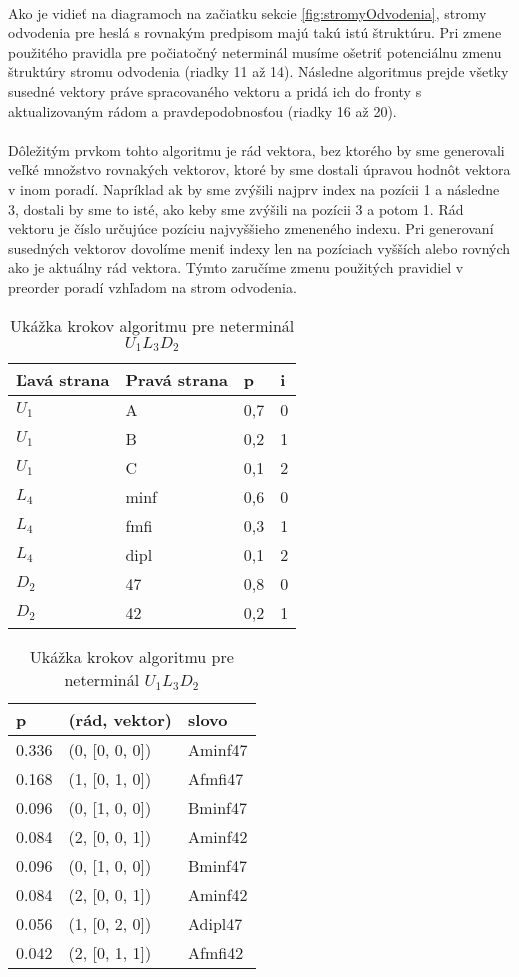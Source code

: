 \paragraph{}
Ako je vidieť na diagramoch na začiatku sekcie \ref{fig:stromyOdvodenia}, stromy odvodenia pre heslá s rovnakým predpisom majú takú istú štruktúru. Pri zmene použitého pravidla pre počiatočný neterminál musíme ošetriť potenciálnu zmenu štruktúry stromu odvodenia (riadky 11 až 14). Následne algoritmus prejde všetky susedné vektory práve spracovaného vektoru a pridá ich do fronty s aktualizovaným rádom a pravdepodobnosťou (riadky 16 až 20).

\paragraph{}
Dôležitým prvkom tohto algoritmu je rád vektora, bez ktorého by sme generovali veľké množstvo rovnakých vektorov, ktoré by sme dostali úpravou hodnôt vektora v inom poradí. Napríklad ak by sme zvýšili najprv index na pozícii 1 a následne 3, dostali by sme to isté, ako keby sme zvýšili na pozícii 3 a potom 1. Rád vektoru je číslo určujúce pozíciu najvyššieho zmeneného indexu. Pri generovaní susedných vektorov dovolíme meniť indexy len na pozíciach vyšších alebo rovných ako je aktuálny rád vektora. Týmto zaručíme zmenu použitých pravidiel v preorder poradí vzhľadom na strom odvodenia.

\begin{table}[]
\centering
\caption{Ukážka krokov algoritmu pre neterminál \(U_1L_3D_2\)}
\label{postupAlgoritmu}
\begin{tabular}{l|lll}
Ľavá strana & Pravá strana & p & i \\ \hline
\(U_1\) & A & 0,7 & 0 \\
\(U_1\) & B & 0,2 & 1 \\
\(U_1\) & C & 0,1 & 2 \\
\(L_4\) & minf & 0,6 & 0 \\
\(L_4\) & fmfi & 0,3 & 1 \\
\(L_4\) & dipl & 0,1 & 2 \\
\(D_2\) & 47 & 0,8 & 0 \\
\(D_2\) & 42 & 0,2 & 1 \\
\end{tabular}
\quad
\begin{tabular}{lll}
p & (rád, vektor) & slovo \\ \hline
0.336 & (0, [0, 0, 0]) & Aminf47 \\ \hline \hline
0.168 & (1, [0, 1, 0]) & Afmfi47 \\
0.096 & (0, [1, 0, 0]) & Bminf47 \\
0.084 & (2, [0, 0, 1]) & Aminf42 \\ \hline \hline
0.096 & (0, [1, 0, 0]) & Bminf47 \\
0.084 & (2, [0, 0, 1]) & Aminf42 \\
0.056 & (1, [0, 2, 0]) & Adipl47 \\
0.042 & (2, [0, 1, 1]) & Afmfi42
\end{tabular}
\end{table}

